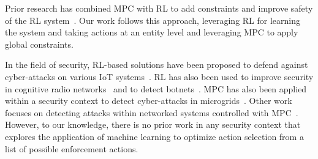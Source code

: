Prior research has combined MPC with RL to add constraints and improve safety of the RL system~\cite{arroyo2022reinforced,zanon2020safe}. Our work follows this approach, leveraging RL for learning the system and taking actions at an entity level and leveraging MPC to apply global constraints.

In the field of security, RL-based solutions have been proposed to defend against cyber-attacks on various IoT systems~\cite{uprety2020reinforcement}. RL has also been used to improve security in cognitive radio networks~\cite{ling2015application} and to detect botnets~\cite{alauthman2020efficient}. MPC has also been applied within a security context to detect cyber-attacks in microgrids~\cite{habibi2021secure}. Other work focuses on detecting attacks within networked systems controlled with MPC~\cite{barboni2018model}. However, to our knowledge, there is no prior work in any security context that explores the application of machine learning to optimize action selection from a list of possible enforcement actions.